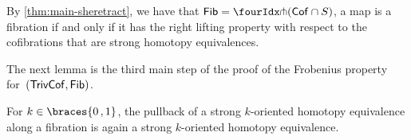 \documentclass[reqno,10pt,a4paper,oneside,draft]{amsart}
\begin{document}
{{\begin{remark} \label{fib-and-she}
By \cref{thm:main-sheretract}, we have that $\Fib = \liftr{(\Cof \cap S)}$, \ie a map is a fibration if and only if it has the right lifting property with respect to the cofibrations that are strong homotopy equivalences.
\end{remark}

The next lemma is the third main step of the proof of the Frobenius property for~$(\mathsf{TrivCof}, \mathsf{Fib})$.

\begin{lemma} \label{thm:non-alg-frobenius-she}
For $k \in \braces{0\,, 1}$, the pullback of a strong $k$-oriented homotopy equivalence along a fibration is again a strong $k$-oriented homotopy equivalence.
\end{lemma}

}}
\end{document}
